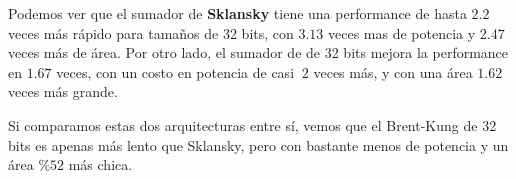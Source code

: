 \begin{table}[h]
\centering
{}
\caption{Comparación de los resultados de las 3 arquitecturas}
\label{tab:comparativa}
\end{table}


Podemos ver que el sumador de \textbf{Sklansky} tiene una performance de hasta $2.2$ veces más rápido para tamaños de 32 bits, con $3.13$ veces mas de potencia y $2.47$ veces más de área. Por otro lado, el sumador de  de 32 bits mejora la performance en $1.67$ veces, con un costo en potencia de casi $~2$ veces más, y con una área $1.62$ veces más grande. 

Si comparamos estas dos arquitecturas entre sí, vemos que el Brent-Kung de 32 bits es apenas más lento que Sklansky, pero con bastante menos de potencia y un área $\%52$ más chica.

